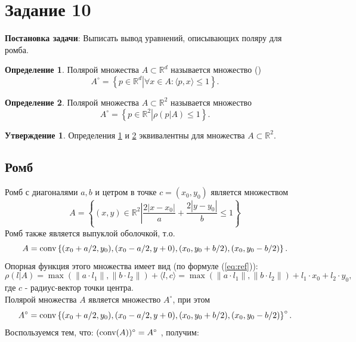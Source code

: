 \documentclass[11pt]{article}
\theoremstyle{definition}
\newtheorem{definition}{Определение}
\newtheorem{statement}{Утверждение}
\begin{document}
    \section{Задание 10}
    {\bf Постановка задачи}:
    Выписать вывод уравнений, описывающих  поляру для ромба.
    \begin{definition}\label{polarn}
    Полярой множества $A \subset \mathbb{R}^d$ называется множество (\cite[c.~53--54]{lokucievskii})
        \begin{equation}
            A^{\circ} = \left\{ p \in \left.\mathbb{R}^{d} \right| \forall x \in A: \langle p, x\rangle  \leqslant 1 \right\}.
        \end{equation}
    \end{definition}
    \begin{definition}\label{5000}
    Полярой множества $A \subset \mathbb{R}^2$ называется множество \cite[c.~29--30]{korobkov}
        \begin{equation}
        A^{\circ} = \left\{ p \in \left.\mathbb{R}^2 \right| \rho (p \left| A\right.) \leqslant 1 \right\}. 
        \end{equation}
    \end{definition}
	\begin{statement}
	Определения \ref{polarn} и \ref{5000} эквивалентны для множества $A \subset \mathbb{R}^2$.
	\end{statement}
    
    \subsection{{\bf Ромб}}
        Ромб с диагоналями $a, b$ и цетром в точке $c = (x_0, y_0)$ является множеством
        \[
        A = \left\{(x, y) \in \mathbb{R}^2 \left| \frac{2|x - x_0|}{a}\right.+\frac{2|y - y_0|}{b} \leqslant 1 \right\} 
        \]
        Ромб также является выпуклой оболочкой, т.о.
        \[
        A = \textrm{conv} \left\{(x_0 + a/2, y_0), (x_0 - a/2, y+0), (x_0, y_0 + b/2), (x_0, y_0 - b/2)\right\}.
        \] 
        Опорная функция этого множества имеет вид (по формуле (\ref{eq:ref})):
        \[
        \rho( l \left| A\right.) = \max(\|a\cdot l_1\|, \|b\cdot l_2\|) + \langle l, c\rangle = \max(\|a\cdot l_1\|, \|b\cdot l_2\|) + l_1\cdot x_0 + l_2\cdot y_0,
        \] 
        где $c$ - радиус-вектор точки центра.
        \\
        Полярой множества $A$ является множество $A^{\circ}$, при этом
        \[
        A^{\circ} = \textrm{conv} \left\{(x_0 + a/2, y_0), (x_0 - a/2, y+0), (x_0, y_0 + b/2), (x_0, y_0 - b/2)\right\}^{\circ}. 
        \]
        Воспользуемся тем, что: $(\textrm{conv} (A))^{\circ} = A^{\circ}$ \cite[c.~53--54]{lokucievskii}, получим:
        
\end{document}
